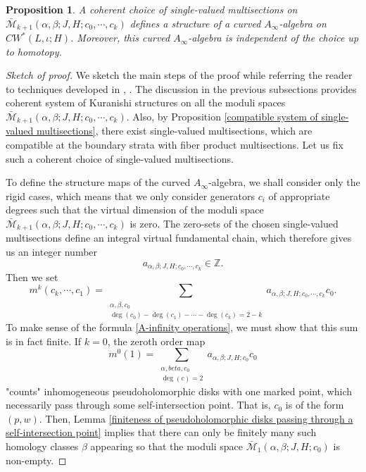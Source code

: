\documentclass{amsart}
\newtheorem{proposition}[theorem]{Proposition}
\numberwithin{equation}{section}
\numberwithin{figure}{section}
\begin{document}
\begin{proposition}
	A coherent choice of single-valued multisections on $\bar{\mathcal{M}}_{k+1}(\alpha, \beta; J, H; c_{0}, \cdots, c_{k})$ defines a structure of a curved $A_{\infty}$-algebra on $CW^{*}(L, \iota; H)$. Moreover, this curved $A_{\infty}$-algebra is independent of the choice up to homotopy. 
\end{proposition}
\begin{proof}[Sketch of proof]
	We sketch the main steps of the proof while referring the reader to techniques developed in \cite{FOOO1}, \cite{FOOO2}. The discussion in the previous subsections provides coherent system of Kuranishi structures on all the moduli spaces $\bar{\mathcal{M}}_{k+1}(\alpha, \beta; J, H; c_{0}, \cdots, c_{k})$. Also, by Proposition \ref{compatible system of single-valued multisections}, there exist single-valued multisections, which are compatible at the boundary strata with fiber product multisections. Let us fix such a coherent choice of single-valued multisections. \par
	To define the structure maps of the curved $A_{\infty}$-algebra, we shall consider only the rigid cases, which means that we only consider generators $c_{i}$ of appropriate degrees such that the virtual dimension of the moduli space $\bar{\mathcal{M}}_{k+1}(\alpha, \beta; J, H; c_{0}, \cdots, c_{k})$ is zero. The zero-sets of the chosen single-valued multisections define an integral virtual fundamental chain, which therefore gives us an integer number
\begin{equation*}
a_{\alpha, \beta; J, H; c_{0}, \cdots, c_{k}} \in \mathbb{Z}.
\end{equation*}
Then we set
\begin{equation}\label{A-infinity operations}
m^{k}(c_{k}, \cdots, c_{1}) = \sum_{\substack{\alpha, \beta, c_{0}\\ \deg(c_{0}) - \deg(c_{1}) - \cdots - \deg(c_{k}) = 2 - k}} a_{\alpha, \beta; J, H; c_{0}, \cdots, c_{k}} c_{0}.
\end{equation}
To make sense of the formula \eqref{A-infinity operations}, we must show that this sum is in fact finite.
If $k = 0$, the zeroth order map
\begin{equation*}
m^{0}(1) = \sum_{\substack{\alpha, beta, c_{0}\\ \deg(c) = 2}} a_{\alpha, \beta; J, H; c_{0}} c_{0}
\end{equation*}
"counts" inhomogeneous pseudoholomorphic disks with one marked point, which necessarily pass through some self-intersection point. That is, $c_{0}$ is of the form $(p, w)$. Then, Lemma \ref{finiteness of pseudoholomorphic disks passing through a self-intersection point} implies that there can only be finitely many such homology classes $\beta$ appearing so that the moduli space $\bar{\mathcal{M}}_{1}(\alpha, \beta; J, H; c_{0})$ is non-empty.

\end{proof}
\end{document}
